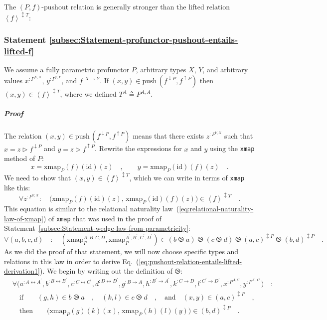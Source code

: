 The $\left(P,f\right)$-pushout relation is generally stronger than
the lifted relation $\left<f\right>^{\updownarrow T}$:

\subsubsection{Statement \label{subsec:Statement-profunctor-pushout-entails-lifted-f}\ref{subsec:Statement-profunctor-pushout-entails-lifted-f}}

We assume a fully parametric profunctor $P$, arbitrary types $X$,
$Y$, and arbitrary values $x^{:P^{X,X}}$, $y^{:P^{Y,Y}}$, and $f^{:X\rightarrow Y}$.
If $(x,y)\in\text{push}\,(f^{\downarrow P},f^{\uparrow P})$ then
$(x,y)\in\left<f\right>^{\updownarrow T}$, where we defined $T^{A}\triangleq P^{A,A}$.

\subparagraph{Proof}

The relation $(x,y)\in\text{push}\,(f^{\downarrow P},f^{\uparrow P})$
means that there exists $z^{:P^{Y,X}}$ such that $x=z\triangleright f^{\downarrow P}$
and $y=z\triangleright f^{\uparrow P}$. Rewrite the expressions for
$x$ and $y$ using the \lstinline!xmap! method of $P$:
\[
x=\text{xmap}_{P}(f)(\text{id})(z)\quad,\quad\quad y=\text{xmap}_{P}(\text{id})(f)(z)\quad.
\]
We need to show that $(x,y)\in\left<f\right>^{\updownarrow T}$, which
we can write in terms of \lstinline!xmap! like this:
\begin{equation}
\forall z^{:P^{Y,X}}:\quad\big(\text{xmap}_{P}(f)(\text{id})(z),\,\text{xmap}_{P}(\text{id})(f)(z)\big)\in\left<f\right>^{\updownarrow T}\quad.\label{eq:pushout-relation-entails-lifted-derivation1}
\end{equation}
This equation is similar to the relational naturality law~(\ref{eq:relational-naturality-law-of-xmap})
of \lstinline!xmap! that was used in the proof of Statement~\ref{subsec:Statement-wedge-law-from-parametricity}:
\[
\forall(a,b,c,d)\quad:\quad(\text{xmap}_{P}^{A,B,C,D},\text{xmap}_{P}^{A^{\prime},B^{\prime},C^{\prime},D^{\prime}})\in(b\ogreaterthan a)\ogreaterthan(c\ogreaterthan d)\ogreaterthan(a,c)^{\updownarrow P}\ogreaterthan(b,d)^{\updownarrow P}\quad.
\]
As we did the proof of that statement, we will now choose specific
types and relations in this law in order to derive Eq.~(\ref{eq:pushout-relation-entails-lifted-derivation1}).
We begin by writing out the definition of $\ogreaterthan$:
\begin{align}
 & \forall\big(a^{:A\leftrightarrow A^{\prime}},b^{:B\leftrightarrow B^{\prime}},c^{:C\leftrightarrow C^{\prime}},d^{:D\leftrightarrow D^{\prime}},g^{:B\rightarrow A},h^{:B^{\prime}\rightarrow A^{\prime}},k^{:C\rightarrow D},l^{:C^{\prime}\rightarrow D^{\prime}},x^{:P^{A,C}},y^{:P^{A^{\prime},C^{\prime}}}\big)\quad:\nonumber \\
 & \quad\text{if}\quad\quad(g,h)\in b\ogreaterthan a\quad,\quad(k,l)\in c\ogreaterthan d\quad,\quad\text{and}\quad(x,y)\in(a,c)^{\updownarrow P}\quad,\nonumber \\
 & \quad\text{then}\quad\quad\big(\text{xmap}_{P}(g)(k)(x),\,\text{xmap}_{P}(h)(l)(y)\big)\in(b,d)^{\updownarrow P}\quad.\label{eq:xmap-relational-law-derivation3}
\end{align}

